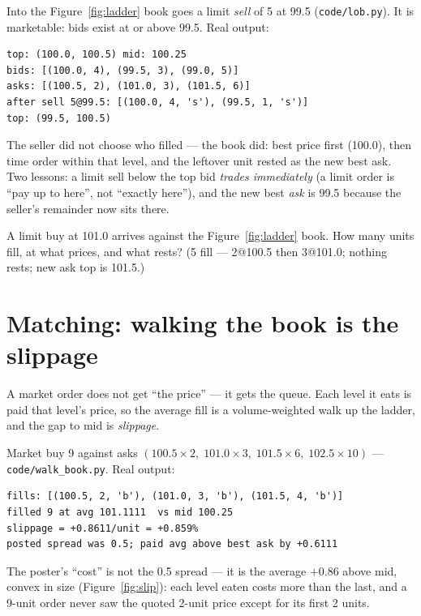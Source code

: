 \begin{example}\label{ex:match}
Into the Figure~\ref{fig:ladder} book goes a limit \emph{sell} of 5
at 99.5 (\texttt{code/lob.py}). It is marketable: bids exist at or
above 99.5. Real output:
\begin{lstlisting}[numbers=none]
top: (100.0, 100.5) mid: 100.25
bids: [(100.0, 4), (99.5, 3), (99.0, 5)]
asks: [(100.5, 2), (101.0, 3), (101.5, 6)]
after sell 5@99.5: [(100.0, 4, 's'), (99.5, 1, 's')]
top: (99.5, 100.5)
\end{lstlisting}
The seller did not choose who filled --- the book did: best price
first (100.0), then time order within that level, and the leftover
unit rested as the new best ask. Two lessons: a limit sell below
the top bid \emph{trades immediately} (a limit order is ``pay up to
here'', not ``exactly here''), and the new best \emph{ask} is 99.5
because the seller's remainder now sits there.
\end{example}

\begin{checkpoint}
A limit buy at 101.0 arrives against the
Figure~\ref{fig:ladder} book. How many units fill, at what
prices, and what rests? (5 fill --- 2@100.5 then 3@101.0; nothing
rests; new ask top is 101.5.)
\end{checkpoint}

\section{Matching: walking the book is the slippage}\label{sec:match}
A market order does not get ``the price'' --- it gets the queue.
Each level it eats is paid that level's price, so the average fill
is a volume-weighted walk up the ladder, and the gap to mid is
\emph{slippage}.

\begin{example}\label{ex:walk}
Market buy 9 against asks $(100.5\!\times\!2,\;101.0\!\times\!3,\;
101.5\!\times\!6,\;102.5\!\times\!10)$ ---
\texttt{code/walk\_book.py}. Real output:
\begin{lstlisting}[numbers=none]
fills: [(100.5, 2, 'b'), (101.0, 3, 'b'), (101.5, 4, 'b')]
filled 9 at avg 101.1111  vs mid 100.25
slippage = +0.8611/unit = +0.859%
posted spread was 0.5; paid avg above best ask by +0.6111
\end{lstlisting}
The poster's ``cost'' is not the 0.5 spread --- it is the average
$+0.86$ above mid, convex in size (Figure~\ref{fig:slip}): each
level eaten costs more than the last, and a 9-unit order never saw
the quoted 2-unit price except for its first 2 units.
\end{example}

